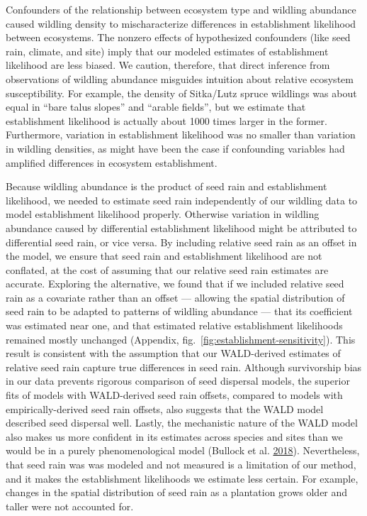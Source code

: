 \documentclass[
]{article}
\begin{document}
Confounders of the relationship between ecosystem type and wildling abundance caused wildling density to mischaracterize differences in establishment likelihood between ecosystems.
The nonzero effects of hypothesized confounders (like seed rain, climate, and site) imply that our modeled estimates of establishment likelihood are less biased.
We caution, therefore, that direct inference from observations of wildling abundance misguides intuition about relative ecosystem susceptibility.
For example, the density of Sitka/Lutz spruce wildlings was about equal in ``bare talus slopes'' and ``arable fields'', but we estimate that establishment likelihood is actually about 1000 times larger in the former.
Furthermore, variation in establishment likelihood was no smaller than variation in wildling densities, as might have been the case if confounding variables had amplified differences in ecosystem establishment.

Because wildling abundance is the product of seed rain and establishment likelihood, we needed to estimate seed rain independently of our wildling data to model establishment likelihood properly.
Otherwise variation in wildling abundance caused by differential establishment likelihood might be attributed to differential seed rain, or vice versa.
By including relative seed rain as an offset in the model, we ensure that seed rain and establishment likelihood are not conflated, at the cost of assuming that our relative seed rain estimates are accurate.
Exploring the alternative, we found that if we included relative seed rain as a covariate rather than an offset --- allowing the spatial distribution of seed rain to be adapted to patterns of wildling abundance --- that its coefficient was estimated near one, and that estimated relative establishment likelihoods remained mostly unchanged (Appendix, fig.~\ref{fig:establishment-sensitivity}).
This result is consistent with the assumption that our WALD-derived estimates of relative seed rain capture true differences in seed rain.
Although survivorship bias in our data prevents rigorous comparison of seed dispersal models, the superior fits of models with WALD-derived seed rain offsets, compared to models with empirically-derived seed rain offsets, also suggests that the WALD model described seed dispersal well.
Lastly, the mechanistic nature of the WALD model also makes us more confident in its estimates across species and sites than we would be in a purely phenomenological model (Bullock et al. \protect\hyperlink{ref-bullockAllDispersalFunctions2018}{2018}).
Nevertheless, that seed rain was was modeled and not measured is a limitation of our method, and it makes the establishment likelihoods we estimate less certain.
For example, changes in the spatial distribution of seed rain as a plantation grows older and taller were not accounted for.
\end{document}
